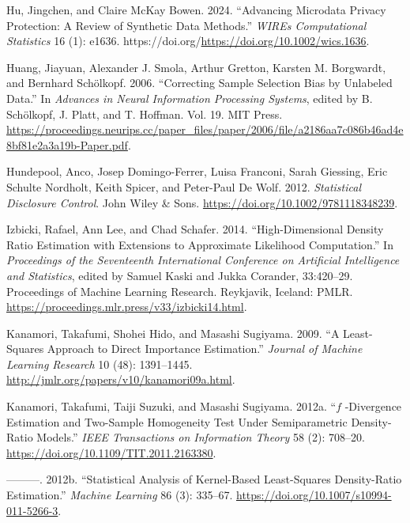 \documentclass[
]{article}
\newlength{\cslhangindent}
\newlength{\cslentryspacingunit} %
\newenvironment{CSLReferences}[2] %
 {%
  \setlength{\parindent}{0pt}
  \ifodd #1
  \let\oldpar\par
  \def\par{\hangindent=\cslhangindent\oldpar}
  \fi
  \setlength{\parskip}{#2\cslentryspacingunit}
 }%
 {}
\begin{document}
\begin{CSLReferences}{1}{0}
\leavevmode{}%
Hu, Jingchen, and Claire McKay Bowen. 2024. {``Advancing Microdata
Privacy Protection: A Review of Synthetic Data Methods.''} \emph{WIREs
Computational Statistics} 16 (1): e1636.
https://doi.org/\url{https://doi.org/10.1002/wics.1636}.

\leavevmode{}%
Huang, Jiayuan, Alexander J. Smola, Arthur Gretton, Karsten M.
Borgwardt, and Bernhard Schölkopf. 2006. {``Correcting Sample Selection
Bias by Unlabeled Data.''} In \emph{Advances in Neural Information
Processing Systems}, edited by B. Schölkopf, J. Platt, and T. Hoffman.
Vol. 19. MIT Press.
\url{https://proceedings.neurips.cc/paper_files/paper/2006/file/a2186aa7c086b46ad4e8bf81e2a3a19b-Paper.pdf}.

\leavevmode{}%
Hundepool, Anco, Josep Domingo-Ferrer, Luisa Franconi, Sarah Giessing,
Eric Schulte Nordholt, Keith Spicer, and Peter-Paul De Wolf. 2012.
\emph{Statistical Disclosure Control}. John Wiley \& Sons.
\url{https://doi.org/10.1002/9781118348239}.

\leavevmode{}%
Izbicki, Rafael, Ann Lee, and Chad Schafer. 2014. {``{High-Dimensional
Density Ratio Estimation with Extensions to Approximate Likelihood
Computation}.''} In \emph{Proceedings of the Seventeenth International
Conference on Artificial Intelligence and Statistics}, edited by Samuel
Kaski and Jukka Corander, 33:420--29. Proceedings of Machine Learning
Research. Reykjavik, Iceland: PMLR.
\url{https://proceedings.mlr.press/v33/izbicki14.html}.

\leavevmode{}%
Kanamori, Takafumi, Shohei Hido, and Masashi Sugiyama. 2009. {``A
Least-Squares Approach to Direct Importance Estimation.''} \emph{Journal
of Machine Learning Research} 10 (48): 1391--1445.
\url{http://jmlr.org/papers/v10/kanamori09a.html}.

\leavevmode{}%
Kanamori, Takafumi, Taiji Suzuki, and Masashi Sugiyama. 2012a. {``\(f\)
-Divergence Estimation and Two-Sample Homogeneity Test Under
Semiparametric Density-Ratio Models.''} \emph{IEEE Transactions on
Information Theory} 58 (2): 708--20.
\url{https://doi.org/10.1109/TIT.2011.2163380}.

\leavevmode{}%
---------. 2012b. {``Statistical Analysis of Kernel-Based Least-Squares
Density-Ratio Estimation.''} \emph{Machine Learning} 86 (3): 335--67.
\url{https://doi.org/10.1007/s10994-011-5266-3}.


\end{CSLReferences}
\end{document}
